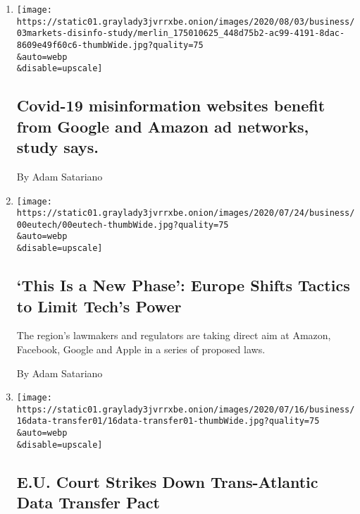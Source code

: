 \begin{enumerate}
\def\labelenumi{\arabic{enumi}.}
\item
  \href{/live/2020/08/03/business/stock-market-today-coronavirus/covid-19-misinformation-websites-benefit-from-google-and-amazon-ad-networks-study-says}{}

  \texttt{[image: https://static01.graylady3jvrrxbe.onion/images/2020/08/03/business/03markets-disinfo-study/merlin\_175010625\_448d75b2-ac99-4191-8dac-8609e49f60c6-thumbWide.jpg?quality=75\\\&auto=webp\\\&disable=upscale]}

  \hypertarget{covid-19-misinformation-websites-benefit-from-google-and-amazon-ad-networks-study-says}{%
  \subsection{Covid-19 misinformation websites benefit from Google and
  Amazon ad networks, study
  says.}\label{covid-19-misinformation-websites-benefit-from-google-and-amazon-ad-networks-study-says}}

  By Adam Satariano
\item
  \href{/2020/07/30/technology/europe-new-phase-tech-amazon-apple-facebook-google.html}{}

  \texttt{[image: https://static01.graylady3jvrrxbe.onion/images/2020/07/24/business/00eutech/00eutech-thumbWide.jpg?quality=75\\\&auto=webp\\\&disable=upscale]}

  \hypertarget{this-is-a-new-phase-europe-shifts-tactics-to-limit-techs-power}{%
  \subsection{`This Is a New Phase': Europe Shifts Tactics to Limit
  Tech's
  Power}\label{this-is-a-new-phase-europe-shifts-tactics-to-limit-techs-power}}

  The region's lawmakers and regulators are taking direct aim at Amazon,
  Facebook, Google and Apple in a series of proposed laws.

  By Adam Satariano
\item
  \href{/2020/07/16/business/eu-data-transfer-pact-rejected.html}{}

  \texttt{[image: https://static01.graylady3jvrrxbe.onion/images/2020/07/16/business/16data-transfer01/16data-transfer01-thumbWide.jpg?quality=75\\\&auto=webp\\\&disable=upscale]}

  \hypertarget{eu-court-strikes-down-trans-atlantic-data-transfer-pact}{%
  \subsection{E.U. Court Strikes Down Trans-Atlantic Data Transfer
  Pact}\label{eu-court-strikes-down-trans-atlantic-data-transfer-pact}}


\end{enumerate}
